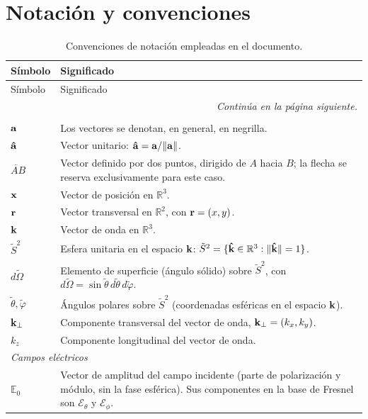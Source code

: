 \chapter*{Notación y convenciones}

\begin{longtable}{p{} p{}}
\caption{Convenciones de notación empleadas en el documento.}
\label{tab:notation_conventions}\\
\hline
Símbolo & Significado \\
\hline
\endfirsthead
\hline
Símbolo & Significado \\
\hline
\endhead
\hline
\multicolumn{2}{r}{\textit{Continúa en la página siguiente.}} \\
\endfoot
\hline
\endlastfoot
\multicolumn{2}{l}{\textit{Vectores y coordenadas}} \\
\hline
$\vb a$ & Los vectores se denotan, en general, en negrilla. \\
$\bm{\hat{\mathbf{a}}}$ & Vector unitario: $\bm{\hat{\mathbf{a}}}=\vb a/\lVert\vb a\rVert$. \\
$\lvec{AB}$ & Vector definido por dos puntos, dirigido de $A$ hacia $B$; la flecha se reserva exclusivamente para este caso. \\
$\vb x$ & Vector de posición en $\mathbb{R}^3$. \\
$\vb r$ & Vector transversal en $\mathbb{R}^2$, con $\vb r=(x,y)$. \\
$\vb k$ & Vector de onda en $\mathbb{R}^3$. \\
$\tilde S^2$ & Esfera unitaria en el espacio $\vb k$: $\tilde S^2=\{\bm{\hat{\mathbf{k}}}\in\mathbb R^3:\|\bm{\hat{\mathbf{k}}}\|=1\}$. \\
$d\tilde\Omega$ & Elemento de superficie (ángulo sólido) sobre $\tilde S^2$, con $d\tilde\Omega=\sin\tilde\theta\,d\tilde\theta\,d\tilde\varphi$. \\
$\tilde\theta,\tilde\varphi$ & Ángulos polares sobre $\tilde S^2$ (coordenadas esféricas en el espacio $\vb k$). \\
$\vb k_\perp$ & Componente transversal del vector de onda, $\vb k_\perp=(k_x,k_y)$. \\
$k_z$ & Componente longitudinal del vector de onda. \\
\hline
\multicolumn{2}{l}{\textit{Campos eléctricos}} \\
\hline
$\mathbb E_0$ & Vector de amplitud del campo incidente (parte de polarización y módulo, sin la fase esférica). Sus componentes en la base de Fresnel son $\mathscr E_\theta$ y $\mathscr E_\phi$. \\

\end{longtable}
